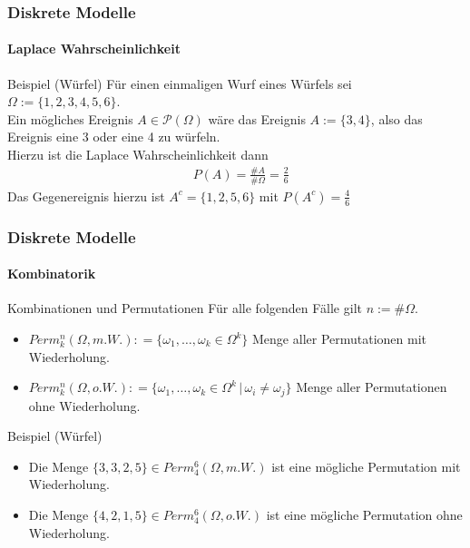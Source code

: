 \documentclass{beamer}
\begin{document}
 \begin{frame}
    \frametitle{Diskrete Modelle}
\framesubtitle{ Laplace Wahrscheinlichkeit}

\begin{block}{Beispiel (Würfel)}
Für einen einmaligen Wurf eines Würfels sei $\Omega := \{1,2,3,4,5,6\}$. \\
Ein mögliches Ereignis $A \in \mathcal{P}(\Omega)$ wäre das Ereignis $A := \{3,4\}$, also das Ereignis eine 3 oder eine 4 zu würfeln.  \\
Hierzu ist die Laplace Wahrscheinlichkeit dann 
\begin{align*}
& P(A) = \frac{ \#A}{ \# \Omega} = \frac{2}{6}
\end{align*}
Das Gegenereignis hierzu ist $A^c = \{1,2,5,6\}$ mit $P(A^c) = \frac{4}{6}$
\end{block}

 \end{frame}



\begin{frame}
    \frametitle{Diskrete Modelle}
\framesubtitle{Kombinatorik}

\begin{block}{Kombinationen und Permutationen}
Für alle folgenden Fälle gilt $n := \#\Omega$.
\begin{itemize}
\item $Perm_k^n(\Omega, m.W.) : = \{ \omega_1, \ldots, \omega_k \in \Omega^k \}$  Menge aller Permutationen mit Wiederholung.
\item $Perm_k^n(\Omega, o.W.) : = \{ \omega_1, \ldots, \omega_k \in \Omega^k  \, | \, \omega_i \neq \omega_j\}$  Menge aller Permutationen ohne Wiederholung.

\end{itemize}
\end{block}
\begin{block}{Beispiel (Würfel)}
\begin{itemize}
\item Die Menge $\{3,3,2,5\} \in Perm_4^6(\Omega, m.W.)$ ist eine mögliche Permutation mit Wiederholung.
\item Die Menge $\{4,2,1,5\} \in Perm_4^6(\Omega, o.W.)$ ist eine mögliche Permutation ohne Wiederholung.
\end{itemize}
\end{block}
 \end{frame}
 
\end{document}
